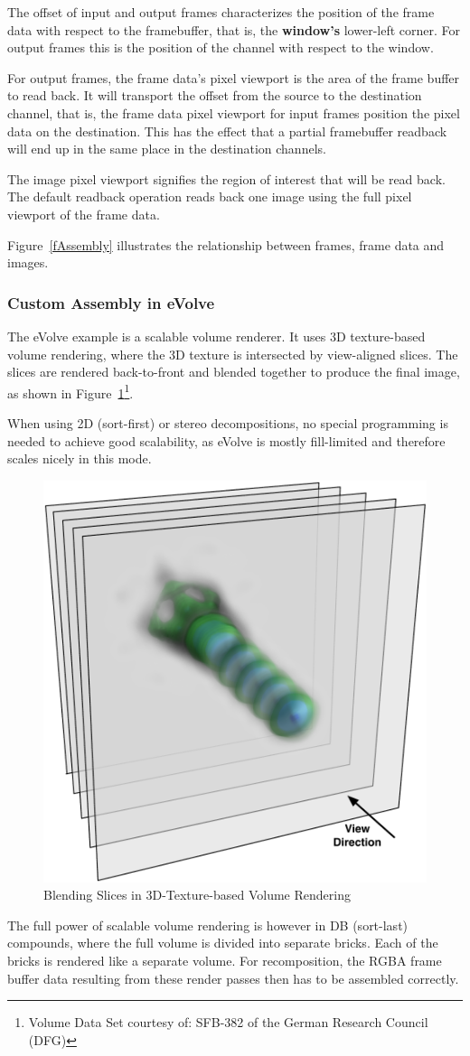 \documentclass[10pt,a4]{scrartcl}
\newcommand{\fig}[1]{Figure~\ref{#1}}
\begin{document}
The offset of input and output frames characterizes the position of the
frame data with respect to the framebuffer, that is, the
\textbf{window's} lower-left corner. For output frames this is the
position of the channel with respect to the window.

For output frames, the frame data's pixel viewport is the area of the
frame buffer to read back. It will transport the offset from the source
to the destination channel, that is, the frame data pixel viewport for
input frames position the pixel data on the destination. This has the
effect that a partial framebuffer readback will end up in the same place
in the destination channels.

The image pixel viewport signifies the region of interest that will be read
back. The default readback operation reads back one image using the full
pixel viewport of the frame data.

\fig{fAssembly} illustrates the relationship between frames, frame data
and images.

\subsubsection{Custom Assembly in eVolve}

The \textsf{eVolve} example is a scalable volume renderer. It uses 3D
texture-based volume rendering, where the 3D texture is intersected by
view-aligned slices. The slices are rendered back-to-front and blended
together to produce the final image, as shown in
\fig{fSlices}\footnote{Volume Data Set courtesy of: SFB-382 of the German
  Research Council (DFG)}.

When using 2D (sort-first) or stereo decompositions, no special
programming is needed to achieve good scalability, as \textsf{eVolve} is
mostly fill-limited and therefore scales nicely in this mode. 

\begin{figure}
  \includegraphics[width=.382\textwidth]{images/slices.pdf}
  {\caption{\small\label{fSlices}Blending Slices in 3D-Texture-based
      Volume Rendering}}
\end{figure}
The full power of scalable volume rendering is however in DB (sort-last)
compounds, where the full volume is divided into separate bricks. Each
of the bricks is rendered like a separate volume. For recomposition, the
\textsf{RGBA} frame buffer data resulting from these render passes then
has to be assembled correctly. 
\end{document}

